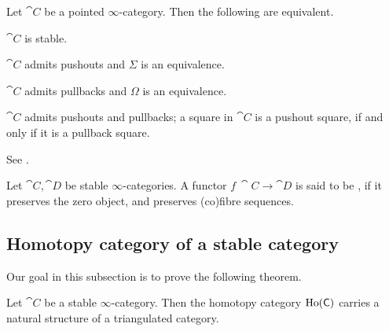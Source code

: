 \begin{theorem} \label{thm-7-s}
    Let $\cat C$ be a pointed $\infty$-category.
    Then the following are equivalent.
    \begin{itms}
        \item $\cat C$ is stable.
        \item $\cat C$ admits pushouts and $\Sigma$ is an equivalence.
        \item $\cat C$ admits pullbacks and $\Omega$ is an equivalence.
        \item $\cat C$ admits pushouts and pullbacks; a square in $\cat C$ is a pushout square,
        if and only if it is a pullback square.
    \end{itms}
\end{theorem}

See \cite[Proposition~1.1.3.4 and Corollary~1.4.2.27]{ha}.

\begin{definition}
    Let $\cat C,\cat D$ be stable $\infty$-categories.
    A functor $f\:\cat C\to\cat D$ is said to be ,
    if it preserves the zero object,
    and preserves (co)fibre sequences.
\end{definition}

\subsection{Homotopy category of a stable category}

Our goal in this subsection is to prove the following theorem.

\begin{theorem}
    Let $\cat C$ be a stable $\infty$-category.
    Then the homotopy category $\operatorname{Ho}(\mathsf{C})$
    carries a natural structure of a triangulated category.
\end{theorem}

